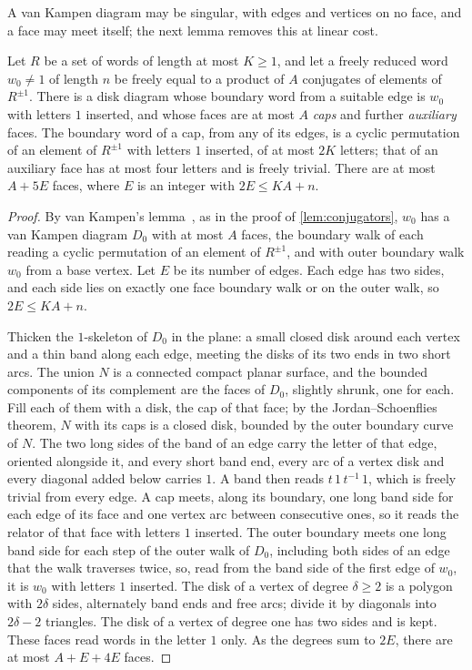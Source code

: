 A van Kampen diagram may be singular, with edges and vertices on no face, and a face may meet itself; the next lemma removes this
at linear cost.

\begin{lemma}\label{lem:regular-diagram}
Let $R$ be a set of words of length at most $K\ge1$, and let a freely reduced word $w_0\ne1$ of length $n$ be freely equal to a
product of $A$ conjugates of elements of $R^{\pm1}$. There is a disk diagram whose boundary word from a suitable edge is $w_0$
with letters $1$ inserted, and whose faces are at most $A$ \emph{caps} and further \emph{auxiliary} faces. The boundary word of a cap, from
any of its edges, is a cyclic permutation of an element of $R^{\pm1}$ with letters $1$ inserted, of at most $2K$ letters; that of
an auxiliary face has at most four letters and is freely trivial. There are at most $A+5E$ faces, where $E$ is an integer with
$2E\le KA+n$.
\end{lemma}

\begin{proof}
By van Kampen's lemma~\cite[Chapter~V, Section~1]{LS77}, as in the proof of \cref{lem:conjugators}, $w_0$ has a van Kampen
diagram $D_0$ with at most $A$ faces, the boundary walk of each reading a cyclic permutation of an element of $R^{\pm1}$, and with outer
boundary walk $w_0$ from a base vertex. Let $E$ be its number of edges. Each edge has two sides, and each side lies on exactly one
face boundary walk or on the outer walk, so $2E\le KA+n$.

Thicken the $1$-skeleton of $D_0$ in the plane: a small closed disk around each vertex and a thin band along each edge, meeting
the disks of its two ends in two short arcs. The union $N$ is a connected compact planar surface, and the bounded components of
its complement are the faces of $D_0$, slightly shrunk, one for each. Fill each of them with a disk, the cap of that face; by the
Jordan--Schoenflies theorem, $N$ with its caps is a closed disk, bounded by the outer boundary curve of $N$. The two long sides of
the band of an edge carry the letter of that edge, oriented alongside it, and every short band end, every arc of a vertex disk and
every diagonal added below carries $1$. A band then reads $t\,1\,t^{-1}\,1$, which is freely trivial from every edge. A cap meets,
along its boundary, one long band side for each edge of its face and one vertex arc between consecutive ones, so it reads the
relator of that face with letters $1$ inserted. The outer boundary meets one long band side for each step of the outer walk of
$D_0$, including both sides of an edge that the walk traverses twice, so, read from the band side of the first edge of $w_0$, it is
$w_0$ with letters $1$ inserted. The disk of a vertex of degree $\delta\ge2$ is a polygon with $2\delta$ sides, alternately band ends
and free arcs; divide it by diagonals into $2\delta-2$ triangles. The disk of a vertex of degree one has two sides and is kept.
These faces read words in the letter $1$ only. As the degrees sum to $2E$, there are at most $A+E+4E$ faces.
\end{proof}

